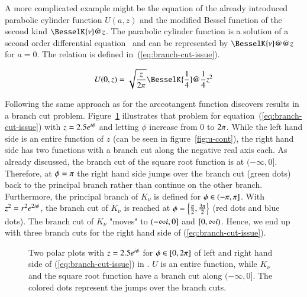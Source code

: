 A more complicated example might be the equation of the already introduced parabolic cylinder function $U(a,z)$ and the modified Bessel function of the second kind $\BesselK{\nu}@{z}$. The parabolic cylinder function is a solution of a second order differential equation~\cite[(12.2i)]{NIST:DLMF} and can be represented by $\BesselK{\nu}@@{z}$ for $a=0$. The relation is defined in~(\ref{eq:branch-cut-issue}). 

\begin{equation}\label{eq:branch-cut-issue}
\displaystyle U(0,z) = \sqrt{\frac{z}{2\cpi}}\BesselK{\frac{1}{4}}@{\frac{1}{4}z^2}
\end{equation}

Following the same approach as for the arccotangent function discovers results in a branch cut problem. Figure~\ref{fig:u-bessel} illustrates that problem for equation~(\ref{eq:branch-cut-issue}) with $z=2.5{e}^{{i}\phi}$ and letting $\phi$ increase from $0$ to $2{\pi}$. While the left hand side is an entire function of $z$ (can be seen in figure~\ref{fig:u-cont}), the right hand side has two functions with a branch cut along the negative real axis each. As already discussed, the branch cut of the square root function is at $(-\infty,0]$. Therefore, at $\phi = {\pi}$ the right hand side jumps over the branch cut (green dots) back to the principal branch rather than continue on the other branch. Furthermore, the principal branch of $K_\nu$ is defined for $\phi \in (-{\pi},{\pi}]$. With $z^2 = r^2{e}^{2{i}\phi}$, the branch cut of $K_\nu$ is reached at $\phi = \left\{ \frac{{\pi}}{2}, \frac{3{\pi}}{2} \right\}$ (red dots and blue dots). The branch cut of $K_\nu$ "moves" to $(-\infty{i},0]$ and $[0,\infty{i})$. Hence, we end up with three branch cuts for the right hand side of (\ref{eq:branch-cut-issue}).

\begin{figure}[!ht]
    \centering
    \hspace{1cm}
    \caption{Two polar plots with $z=2.5{e}^{{i}\phi}$ for $\phi \in [0,2{\pi}]$ of left and right hand side of (\ref{eq:branch-cut-issue}) in \Maple. $U$ is an entire function, while $K_\nu$ and the square root function have a branch cut along $(-\infty,0]$. The colored dots represent the jumps over the branch cuts.}
    \label{fig:u-bessel}
\end{figure}

